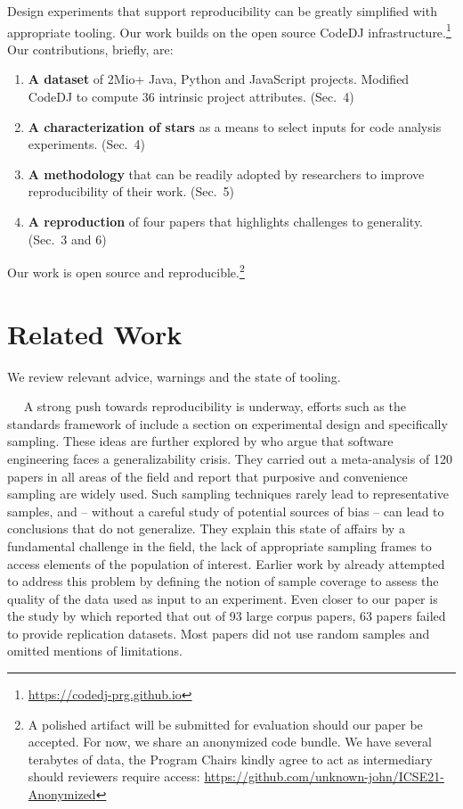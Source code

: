 \documentclass[sigconf,review,anonymous]{acmart}
\renewcommand{\dj}{{\textsf{Code{\small{DJ}}}}\xspace}
\begin{document}
Design experiments that support reproducibility can be greatly simplified with
appropriate tooling. Our work builds on the open source \dj
infrastructure.\footnote{\url{https://codedj-prg.github.io}} Our contributions,
briefly, are:
\begin{enumerate}[leftmargin=*]
\item {\bf A dataset} of 2Mio+ Java, Python and JavaScript projects. Modified
  \dj to compute 36 intrinsic project attributes. (Sec.~4)
\item {\bf A characterization of stars} as a means to select inputs for code
  analysis experiments. (Sec.~4)
\item {\bf A methodology} that can be readily adopted by researchers to improve
  reproducibility of their work. (Sec.~5)
\item {\bf A reproduction} of four papers that highlights challenges to
  generality. (Sec.~3 and 6)
\end{enumerate}

\noindent
Our work is open source and reproducible.\footnote{A polished artifact will be
submitted for evaluation should our paper be accepted. For now, we share an
anonymized code bundle. We have several terabytes of data, the Program Chairs
kindly agree to act as intermediary should reviewers require access:
\url{https://github.com/unknown-john/ICSE21-Anonymized}}

\section{Related Work}

We review relevant advice, warnings and the state of tooling.

\newcommand{\mypara}[1]{\vspace{2mm}\noindent{\bf #1}~~}


\mypara{Community Standards.} A strong push towards reproducibility is underway,
efforts such as the standards framework of \citet{Ralph:2021} include a section
on experimental design and specifically sampling. These ideas are further
explored by \citet{baltes20} who argue that software engineering faces a
generalizability crisis. They carried out a meta-analysis of 120 papers in all
areas of the field and report that purposive and convenience sampling are widely
used. Such sampling techniques rarely lead to representative samples, and --
without a careful study of potential sources of bias -- can lead to conclusions
that do not generalize. They explain this state of affairs by a fundamental
challenge in the field, the lack of appropriate sampling frames to access
elements of the population of interest. Earlier work by \citet{Nagappan:2013}
already attempted to address this problem by defining the notion of sample
coverage to assess the quality of the data used as input to an experiment. Even
closer to our paper is the study by \citet{Cosentino:MSR16} which reported that
out of 93 large corpus papers, 63 papers failed to provide replication datasets.
Most papers did not use random samples and omitted mentions of limitations.
\end{document}
